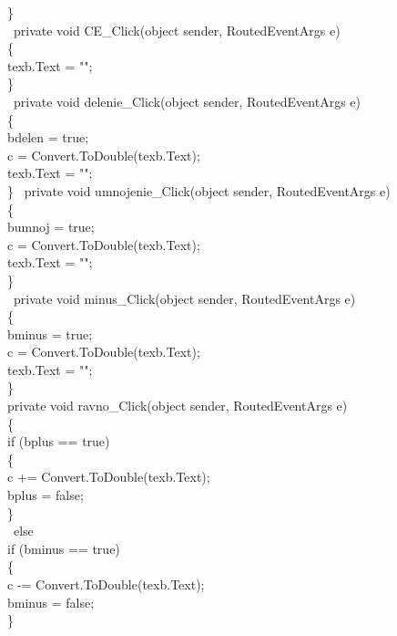         \}\\
\
        private void CE\_Click(object sender, RoutedEventArgs e)\\
        \{\\
            texb.Text = "";\\
        \}\\
\
        private void delenie\_Click(object sender, RoutedEventArgs e)\\
        \{\\
            bdelen = true;\\
            c = Convert.ToDouble(texb.Text);\\
            texb.Text = "";\\
        \}
\
        private void umnojenie\_Click(object sender, RoutedEventArgs e)\\
        \{\\
            bumnoj = true;\\
            c = Convert.ToDouble(texb.Text);\\
            texb.Text = "";\\
        \}\\
\
        private void minus\_Click(object sender, RoutedEventArgs e)\\
        \{\\
            bminus = true;\\
            c = Convert.ToDouble(texb.Text);\\
            texb.Text = "";\\
        \}\\

        private void ravno\_Click(object sender, RoutedEventArgs e)\\
        \{\\
            if (bplus == true)\\
            \{\\
                c += Convert.ToDouble(texb.Text);\\
                bplus = false;\\
            \}\\
\
            else\\
            if (bminus == true)\\
            \{\\
                c -= Convert.ToDouble(texb.Text);\\
                bminus = false;\\
            \}\\

